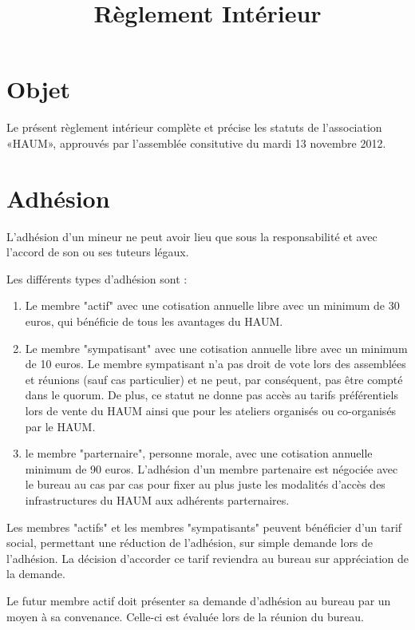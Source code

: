 \documentclass[a4paper, 11pt]{article}
\title{Règlement Intérieur}
\author{}
\date{}
\newcommand{\nomHS}{HAUM}
\newcommand{\dateAGC}{mardi 13 novembre 2012}
\newcommand{\prixNormal}{30 euros}
\newcommand{\prixSympatisant}{10 euros}
\newcommand{\prixPartenaire}{90 euros}
\begin{document}
    \maketitle

\section{Objet} %

Le présent règlement intérieur complète et précise les statuts de l'association «\nomHS», approuvés par l'assemblée
consitutive du \dateAGC{}.


\section{Adhésion} %

L'adhésion d'un mineur ne peut avoir lieu que sous la responsabilité et avec l'accord de son ou ses tuteurs légaux.

Les différents types d'adhésion sont :

\begin{enumerate}
	\item Le membre "actif" avec une cotisation annuelle libre avec un minimum de \prixNormal{}, qui bénéficie de tous les avantages du \nomHS{}.
	\item Le membre "sympatisant" avec une cotisation annuelle libre avec un minimum de \prixSympatisant{}. Le membre sympatisant n'a pas droit de vote lors des assemblées et réunions (sauf cas particulier) et ne peut, par conséquent, pas être compté dans le quorum. De plus, ce statut ne donne pas accès au tarifs préférentiels lors de vente du \nomHS{} ainsi que pour les ateliers organisés ou co-organisés par le \nomHS{}.
	\item le membre "parternaire", personne morale, avec une cotisation annuelle minimum de \prixPartenaire{}. L'adhésion d'un membre partenaire est négociée avec le bureau au cas par cas pour fixer au plus juste les modalités d'accès des infrastructures du \nomHS{} aux adhérents parternaires.
\end{enumerate}

Les membres "actifs" et les membres "sympatisants" peuvent bénéficier d'un tarif social, permettant une réduction de l'adhésion, sur simple demande lors de l'adhésion. La décision d'accorder ce tarif reviendra au bureau sur appréciation de la demande.

Le futur membre actif doit présenter sa demande d'adhésion au bureau par un moyen à sa convenance.
Celle-ci est évaluée lors de la réunion du bureau.
\end{document}
